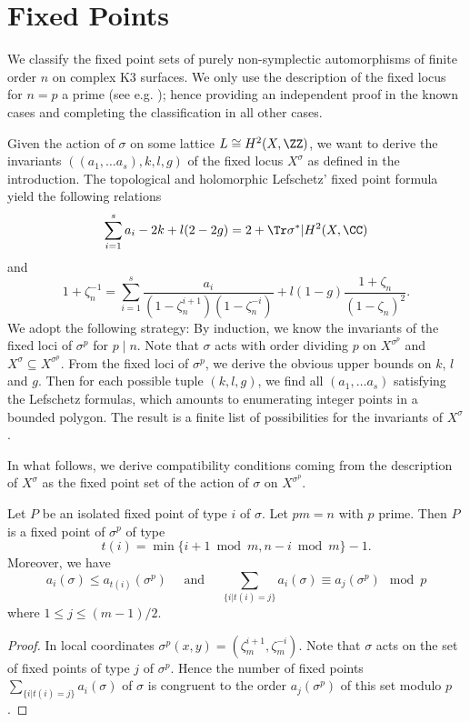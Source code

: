 \section{Fixed Points}\label{sec:fixed}
We classify the fixed point sets of purely non-symplectic automorphisms of finite order $n$ on complex K3 surfaces.
We only use the description of the fixed locus for $n=p$ a prime (see e.g. \cite{artebani-sarti-taki}); hence providing an independent proof in the known cases and completing the classification in all other cases.

Given the action of $\sigma$ on some lattice $L \cong H^2(X,\ZZ)$, we want to derive the invariants $((a_1,\dots a_s),k,l,g)$
of the fixed locus $X^\sigma$ as defined in the introduction.
The topological and holomorphic Lefschetz' fixed point formula \cite[Thm. 4.6]{atiyah-singer1968} yield the following relations
\[\sum_{i=1}^s a_i -2k + l(2 - 2g)
= 2 + \Tr \sigma^*|H^2(X,\CC)\]
and
\[1+\zeta_n^{-1} = \sum_{i=1}^s \frac{a_i}{(1-\zeta_n^{i+1})(1-\zeta_n^{-i})}+l(1-g) \frac{1+\zeta_n}{(1-\zeta_n)^2}.\]
We adopt the following strategy:
By induction, we know the invariants of the fixed loci of $\sigma^p$ for $p \mid n$.
Note that $\sigma$ acts with order dividing $p$ on $X^{\sigma^p}$ and $X^\sigma \subseteq X^{\sigma^p}$.
From the fixed loci of $\sigma^p$, we derive
the obvious upper bounds on $k$, $l$ and $g$.
Then for each possible tuple $(k,l,g)$, we find all $(a_1,\dots a_s)$ satisfying the Lefschetz formulas, which amounts to enumerating integer points in a bounded polygon.
The result is a finite list of possibilities for the invariants of $X^\sigma$.

In what follows, we derive compatibility conditions coming from the description of $X^\sigma$ as the fixed point set of the action of $\sigma$ on $X^{\sigma^p}$.
\begin{lemma}\label{fixed points on curves}
 Let $P$ be an isolated fixed point of type $i$ of $\sigma$. Let $p m = n$ with $p$ prime. Then $P$ is a fixed point of $\sigma^p$ of type
 \[t(i) = \min\{i + 1 \bmod m,n -i \bmod m\} - 1.\]
 Moreover, we have
 \[a_i(\sigma) \leq a_{t(i)}(\sigma^p) \quad \mbox{ and } \quad \sum_{\{i | t(i)=j\}}a_i(\sigma) \equiv a_{j}(\sigma^p) \mod p\]
  where $1 \leq j \leq (m-1)/2$.
\end{lemma}
\begin{proof}
  In local coordinates $\sigma^p(x,y) = (\zeta_m^{i+1},\zeta_m^{-i})$. Note that $\sigma$ acts on the set of fixed points of type $j$ of $\sigma^p$. Hence the number of fixed points $ \sum_{\{i|t(i)=j\}}a_i(\sigma)$ of $\sigma$ is congruent to the order $a_j(\sigma^p)$ of this set modulo $p$.
\end{proof}

